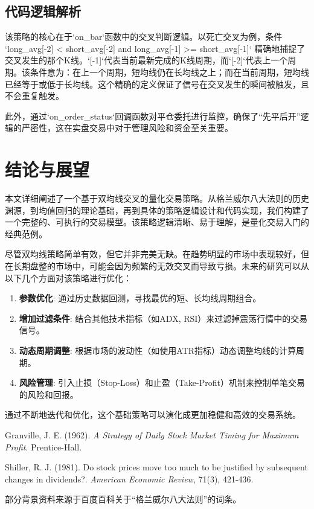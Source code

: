 \documentclass[UTF8]{ctexart}
\begin{document}
\subsection{代码逻辑解析}
该策略的核心在于`on_bar`函数中的交叉判断逻辑。以死亡交叉为例，条件 `long_avg[-2] < short_avg[-2] and long_avg[-1] >= short_avg[-1]` 精确地捕捉了交叉发生的那个K线。`[-1]`代表当前最新完成的K线周期，而`[-2]`代表上一个周期。该条件意为：在上一个周期，短均线仍在长均线之上；而在当前周期，短均线已经等于或低于长均线。这个精确的定义保证了信号在交叉发生的瞬间被触发，且不会重复触发。

此外，通过`on_order_status`回调函数对平仓委托进行监控，确保了“先平后开”逻辑的严密性，这在实盘交易中对于管理风险和资金至关重要。

\section{结论与展望}

本文详细阐述了一个基于双均线交叉的量化交易策略。从格兰威尔八大法则的历史渊源，到均值回归的理论基础，再到具体的策略逻辑设计和代码实现，我们构建了一个完整的、可执行的交易模型。该策略逻辑清晰、易于理解，是量化交易入门的经典范例。

尽管双均线策略简单有效，但它并非完美无缺。在趋势明显的市场中表现较好，但在长期盘整的市场中，可能会因为频繁的无效交叉而导致亏损。未来的研究可以从以下几个方面对该策略进行优化：
\begin{enumerate}
    \item \textbf{参数优化}: 通过历史数据回测，寻找最优的短、长均线周期组合。
    \item \textbf{增加过滤条件}: 结合其他技术指标（如ADX, RSI）来过滤掉震荡行情中的交易信号。
    \item \textbf{动态周期调整}: 根据市场的波动性（如使用ATR指标）动态调整均线的计算周期。
    \item \textbf{风险管理}: 引入止损（Stop-Loss）和止盈（Take-Profit）机制来控制单笔交易的风险和回报。
\end{enumerate}

通过不断地迭代和优化，这个基础策略可以演化成更加稳健和高效的交易系统。

\begin{thebibliography}{9}
    Granville, J. E. (1962). \textit{A Strategy of Daily Stock Market Timing for Maximum Profit}. Prentice-Hall.
    
    Shiller, R. J. (1981). Do stock prices move too much to be justified by subsequent changes in dividends?. \textit{American Economic Review}, 71(3), 421-436.

    部分背景资料来源于百度百科关于“格兰威尔八大法则”的词条。
\end{thebibliography}
\end{document}

